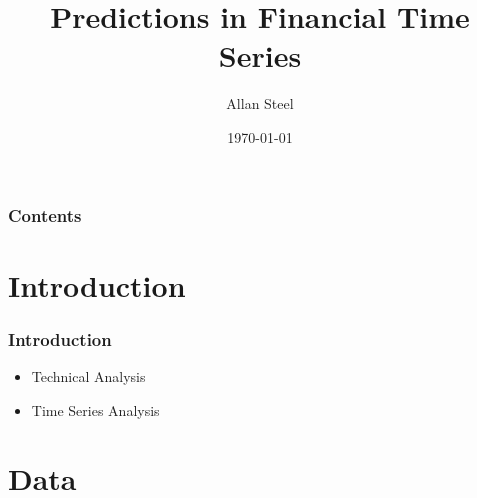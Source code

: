 \documentclass{beamer}
\title[Predictions in Financial Time Series]{Predictions in Financial Time Series} %
\author{Allan Steel} %
\institute[ITB] %
{
Institute of Technology Blanchardstown \\ %
\medskip
\textit{allan@allansteel.com} %
}
\date{\today} %
\begin{document}
\begin{frame}
\titlepage %
\end{frame}

\begin{frame}
\frametitle{Contents} %
\tableofcontents %
\end{frame}


\section{Introduction} %


\begin{frame}
\frametitle{Introduction}
\begin{itemize}
\item Technical Analysis
\item Time Series Analysis
\end{itemize}

\end{frame}


\section{Data} %
\end{document}
